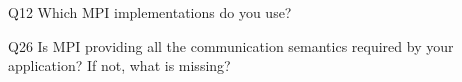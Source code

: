 \begin{description}%
\item{Q12} Which MPI implementations do you use?%
\item{Q26} Is MPI providing all the communication semantics required by your application? If not, what is missing?%
\end{description}%
